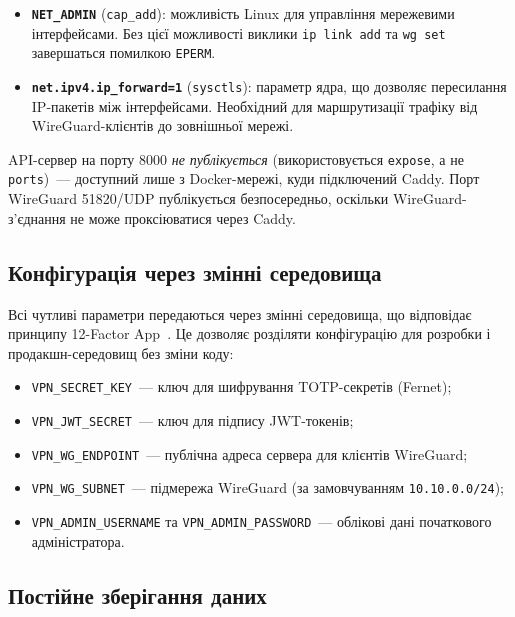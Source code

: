 \begin{itemize}
  \item \textbf{\texttt{NET\_ADMIN}} (\texttt{cap\_add}): можливість
    Linux для управління мережевими інтерфейсами. Без цієї можливості
    виклики \texttt{ip link add} та \texttt{wg set} завершаться
    помилкою \texttt{EPERM}.

  \item \textbf{\texttt{net.ipv4.ip\_forward=1}} (\texttt{sysctls}):
    параметр ядра, що дозволяє пересилання IP-пакетів між інтерфейсами.
    Необхідний для маршрутизації трафіку від WireGuard-клієнтів
    до зовнішньої мережі.
\end{itemize}

API-сервер на порту 8000 \textit{не публікується} (використовується
\texttt{expose}, а не \texttt{ports})~--- доступний лише з Docker-мережі,
куди підключений Caddy. Порт WireGuard 51820/UDP публікується
безпосередньо, оскільки WireGuard-з'єднання не може проксіюватися
через Caddy.

\subsection{Конфігурація через змінні середовища}

Всі чутливі параметри передаються через змінні середовища, що відповідає
принципу 12-Factor App~\cite{heroku_12factor}. Це дозволяє розділяти
конфігурацію для розробки і продакшн-середовищ без зміни коду:

\begin{itemize}
  \item \texttt{VPN\_SECRET\_KEY}~--- ключ для шифрування TOTP-секретів
    (Fernet);
  \item \texttt{VPN\_JWT\_SECRET}~--- ключ для підпису JWT-токенів;
  \item \texttt{VPN\_WG\_ENDPOINT}~--- публічна адреса сервера
    для клієнтів WireGuard;
  \item \texttt{VPN\_WG\_SUBNET}~--- підмережа WireGuard
    (за замовчуванням \texttt{10.10.0.0/24});
  \item \texttt{VPN\_ADMIN\_USERNAME} та \texttt{VPN\_ADMIN\_PASSWORD}~---
    облікові дані початкового адміністратора.
\end{itemize}

\subsection{Постійне зберігання даних}

